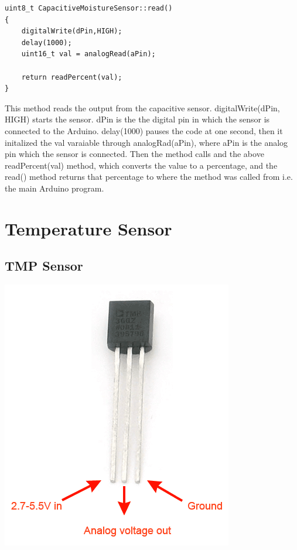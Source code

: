 \documentclass[a4paper,12pt,twoside,openright,titlepage]{book}
\begin{document}
\begin{lstlisting}[language=Arduino]
uint8_t CapacitiveMoistureSensor::read()
{
	digitalWrite(dPin,HIGH);
	delay(1000);
    uint16_t val = analogRead(aPin);
	
    return readPercent(val);
}
\end{lstlisting}

This method reads the output from the capacitive sensor. digitalWrite(dPin, HIGH) starts the sensor. dPin is the the digital pin in which the sensor is connected to the Arduino. delay(1000) pauses the code at one second, then it initalized the val varaiable through analogRad(aPin), where aPin is the analog pin which the sensor is connected. Then the method calls and  the above readPercent(val) method, which converts the value to a percentage, and the read() method returns that percentage to where the method was called from i.e. the main Arduino program.

\section{Temperature Sensor}
\subsection{TMP Sensor}
\begin{center}
\includegraphics[scale=0.8]{TMP-36}
\end{center}
\end{document}
